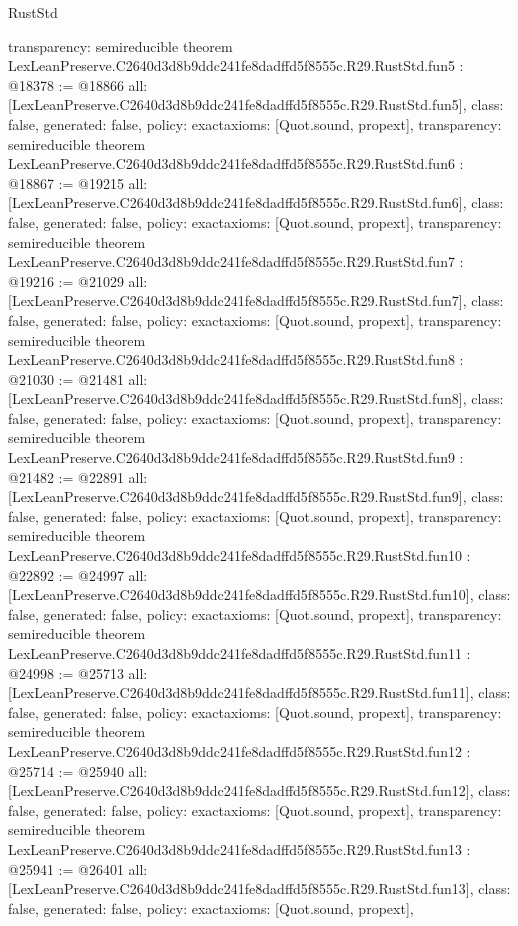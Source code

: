 \begin{lexlean}{RustStd}
\begin{coremodule}
{  transparency: semireducible
}
theorem LexLeanPreserve.C2640d3d8b9ddc241fe8dadffd5f8555c.R29.RustStd.fun5 : @18378 := @18866 {
  all: [LexLeanPreserve.C2640d3d8b9ddc241fe8dadffd5f8555c.R29.RustStd.fun5],
  class: false,
  generated: false,
  policy: exact{axioms: [Quot.sound, propext]},
  transparency: semireducible
}
theorem LexLeanPreserve.C2640d3d8b9ddc241fe8dadffd5f8555c.R29.RustStd.fun6 : @18867 := @19215 {
  all: [LexLeanPreserve.C2640d3d8b9ddc241fe8dadffd5f8555c.R29.RustStd.fun6],
  class: false,
  generated: false,
  policy: exact{axioms: [Quot.sound, propext]},
  transparency: semireducible
}
theorem LexLeanPreserve.C2640d3d8b9ddc241fe8dadffd5f8555c.R29.RustStd.fun7 : @19216 := @21029 {
  all: [LexLeanPreserve.C2640d3d8b9ddc241fe8dadffd5f8555c.R29.RustStd.fun7],
  class: false,
  generated: false,
  policy: exact{axioms: [Quot.sound, propext]},
  transparency: semireducible
}
theorem LexLeanPreserve.C2640d3d8b9ddc241fe8dadffd5f8555c.R29.RustStd.fun8 : @21030 := @21481 {
  all: [LexLeanPreserve.C2640d3d8b9ddc241fe8dadffd5f8555c.R29.RustStd.fun8],
  class: false,
  generated: false,
  policy: exact{axioms: [Quot.sound, propext]},
  transparency: semireducible
}
theorem LexLeanPreserve.C2640d3d8b9ddc241fe8dadffd5f8555c.R29.RustStd.fun9 : @21482 := @22891 {
  all: [LexLeanPreserve.C2640d3d8b9ddc241fe8dadffd5f8555c.R29.RustStd.fun9],
  class: false,
  generated: false,
  policy: exact{axioms: [Quot.sound, propext]},
  transparency: semireducible
}
theorem LexLeanPreserve.C2640d3d8b9ddc241fe8dadffd5f8555c.R29.RustStd.fun10 : @22892 := @24997 {
  all: [LexLeanPreserve.C2640d3d8b9ddc241fe8dadffd5f8555c.R29.RustStd.fun10],
  class: false,
  generated: false,
  policy: exact{axioms: [Quot.sound, propext]},
  transparency: semireducible
}
theorem LexLeanPreserve.C2640d3d8b9ddc241fe8dadffd5f8555c.R29.RustStd.fun11 : @24998 := @25713 {
  all: [LexLeanPreserve.C2640d3d8b9ddc241fe8dadffd5f8555c.R29.RustStd.fun11],
  class: false,
  generated: false,
  policy: exact{axioms: [Quot.sound, propext]},
  transparency: semireducible
}
theorem LexLeanPreserve.C2640d3d8b9ddc241fe8dadffd5f8555c.R29.RustStd.fun12 : @25714 := @25940 {
  all: [LexLeanPreserve.C2640d3d8b9ddc241fe8dadffd5f8555c.R29.RustStd.fun12],
  class: false,
  generated: false,
  policy: exact{axioms: [Quot.sound, propext]},
  transparency: semireducible
}
theorem LexLeanPreserve.C2640d3d8b9ddc241fe8dadffd5f8555c.R29.RustStd.fun13 : @25941 := @26401 {
  all: [LexLeanPreserve.C2640d3d8b9ddc241fe8dadffd5f8555c.R29.RustStd.fun13],
  class: false,
  generated: false,
  policy: exact{axioms: [Quot.sound, propext]},
}
\end{coremodule}
\end{lexlean}
